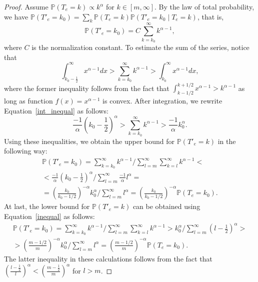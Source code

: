 \documentclass[sigconf, anonymous]{acmart}
\renewcommand{\P}{\mathbb{P}}
\begin{document}
\begin{proof}
Assume $\P(T_e=k)\propto k^{\alpha}$ for $k\in [m,\infty]$. By the law of total probability, we have $\P(T'_e=k_0)= \sum_{k}\P(T_e=k)\P(T'_e=k_0\mid T_e=k)$, that is,
$$
\P(T'_e=k_0) = C \sum_{k=k_0}^{\infty} k^{\alpha-1},
$$
where $C$ is the normalization constant. To estimate the sum of the series, notice that
\begin{equation}\label{int_inequal}
\int_{k_0-\frac{1}{2}}^\infty x^{\alpha-1} dx > \sum_{k=k_0}^{\infty} k^{\alpha-1} > \int_{k_0}^\infty x^{\alpha-1} dx,    
\end{equation}
where the former inequality follows from the fact that $\int_{k-1/2}^{k+1/2} x^{\alpha-1}> k^{\alpha-1}$ as long as function $f(x)=x^{\alpha-1}$ is convex. After integration, we rewrite Equation~\ref{int_inequal} as follows:
\begin{equation}\label{inequal}
\frac{-1}{\alpha} \left ( k_0-\frac{1}{2}\right )^{\alpha} > \sum_{k=k_0}^{\infty} k^{\alpha-1} > \frac{-1}{\alpha} k_0^{\alpha}. \end{equation}
Using these inequalities, we obtain the upper bound for $\P(T'_e=k)%
$ in the following way:
\begin{multline*}
\P(T'_e=k_0) = \sum_{k=k_0}^{\infty} k^{\alpha-1} / \sum_{l=m}^\infty \sum_{k=l}^{\infty} k^{\alpha-1} < \\
< \frac{-1}{\alpha} \left ( k_0-\frac{1}{2}\right )^{\alpha} / \sum_{l=m}^\infty \frac{-1}{\alpha} l^{\alpha} = \\
=\left (\frac{k_0}{k_0-1/2}\right )^{-\alpha} k_0^\alpha/\sum_{l=m}^\infty l^{\alpha} = \left (\frac{k_0}{k_0-1/2}\right )^{-\alpha} \P(T_e=k_0).
\end{multline*}
At last, the lower bound for $\P(T'_e=k)%
$ can be obtained using Equation~\ref{inequal} as follows:
\begin{multline*}
\P(T'_e=k_0) = \sum_{k=k_0}^{\infty} k^{\alpha-1} / \sum_{l=m}^\infty \sum_{k=l}^{\infty} k^{\alpha-1} > k_0^{\alpha} / \sum_{l=m}^\infty  \left (l-\frac{1}{2}\right )^{\alpha} > \\
> \left (\frac{m-1/2}{m}\right )^{-\alpha} k_0^\alpha/\sum_{l=m}^\infty l^{\alpha} = \left (\frac{m-1/2}{m}\right )^{-\alpha} \P(T_e=k_0).
\end{multline*}
The latter inequality in these calculations follows from the fact that $\left (\frac{l-\frac{1}{2}}{l}\right )^{\alpha}<\left (\frac{m-\frac{1}{2}}{m}\right )^{\alpha}$ for $l>m$.

\end{proof}
\end{document}
